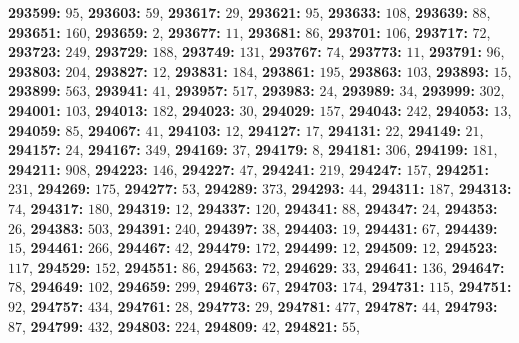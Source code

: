 \textsf{\bfseries 293599:} $95$, \textsf{\bfseries 293603:} $59$, \textsf{\bfseries 293617:} $29$, \textsf{\bfseries 293621:} $95$, \textsf{\bfseries 293633:} $108$, \textsf{\bfseries 293639:} $88$, \textsf{\bfseries 293651:} $160$, \textsf{\bfseries 293659:} $2$, \textsf{\bfseries 293677:} $11$, \textsf{\bfseries 293681:} $86$, \textsf{\bfseries 293701:} $106$, \textsf{\bfseries 293717:} $72$, \textsf{\bfseries 293723:} $249$, \textsf{\bfseries 293729:} $188$, \textsf{\bfseries 293749:} $131$, \textsf{\bfseries 293767:} $74$, \textsf{\bfseries 293773:} $11$, \textsf{\bfseries 293791:} $96$, \textsf{\bfseries 293803:} $204$, \textsf{\bfseries 293827:} $12$, \textsf{\bfseries 293831:} $184$, \textsf{\bfseries 293861:} $195$, \textsf{\bfseries 293863:} $103$, \textsf{\bfseries 293893:} $15$, \textsf{\bfseries 293899:} $563$, \textsf{\bfseries 293941:} $41$, \textsf{\bfseries 293957:} $517$, \textsf{\bfseries 293983:} $24$, \textsf{\bfseries 293989:} $34$, \textsf{\bfseries 293999:} $302$, \textsf{\bfseries 294001:} $103$, \textsf{\bfseries 294013:} $182$, \textsf{\bfseries 294023:} $30$, \textsf{\bfseries 294029:} $157$, \textsf{\bfseries 294043:} $242$, \textsf{\bfseries 294053:} $13$, \textsf{\bfseries 294059:} $85$, \textsf{\bfseries 294067:} $41$, \textsf{\bfseries 294103:} $12$, \textsf{\bfseries 294127:} $17$, \textsf{\bfseries 294131:} $22$, \textsf{\bfseries 294149:} $21$, \textsf{\bfseries 294157:} $24$, \textsf{\bfseries 294167:} $349$, \textsf{\bfseries 294169:} $37$, \textsf{\bfseries 294179:} $8$, \textsf{\bfseries 294181:} $306$, \textsf{\bfseries 294199:} $181$, \textsf{\bfseries 294211:} $908$, \textsf{\bfseries 294223:} $146$, \textsf{\bfseries 294227:} $47$, \textsf{\bfseries 294241:} $219$, \textsf{\bfseries 294247:} $157$, \textsf{\bfseries 294251:} $231$, \textsf{\bfseries 294269:} $175$, \textsf{\bfseries 294277:} $53$, \textsf{\bfseries 294289:} $373$, \textsf{\bfseries 294293:} $44$, \textsf{\bfseries 294311:} $187$, \textsf{\bfseries 294313:} $74$, \textsf{\bfseries 294317:} $180$, \textsf{\bfseries 294319:} $12$, \textsf{\bfseries 294337:} $120$, \textsf{\bfseries 294341:} $88$, \textsf{\bfseries 294347:} $24$, \textsf{\bfseries 294353:} $26$, \textsf{\bfseries 294383:} $503$, \textsf{\bfseries 294391:} $240$, \textsf{\bfseries 294397:} $38$, \textsf{\bfseries 294403:} $19$, \textsf{\bfseries 294431:} $67$, \textsf{\bfseries 294439:} $15$, \textsf{\bfseries 294461:} $266$, \textsf{\bfseries 294467:} $42$, \textsf{\bfseries 294479:} $172$, \textsf{\bfseries 294499:} $12$, \textsf{\bfseries 294509:} $12$, \textsf{\bfseries 294523:} $117$, \textsf{\bfseries 294529:} $152$, \textsf{\bfseries 294551:} $86$, \textsf{\bfseries 294563:} $72$, \textsf{\bfseries 294629:} $33$, \textsf{\bfseries 294641:} $136$, \textsf{\bfseries 294647:} $78$, \textsf{\bfseries 294649:} $102$, \textsf{\bfseries 294659:} $299$, \textsf{\bfseries 294673:} $67$, \textsf{\bfseries 294703:} $174$, \textsf{\bfseries 294731:} $115$, \textsf{\bfseries 294751:} $92$, \textsf{\bfseries 294757:} $434$, \textsf{\bfseries 294761:} $28$, \textsf{\bfseries 294773:} $29$, \textsf{\bfseries 294781:} $477$, \textsf{\bfseries 294787:} $44$, \textsf{\bfseries 294793:} $87$, \textsf{\bfseries 294799:} $432$, \textsf{\bfseries 294803:} $224$, \textsf{\bfseries 294809:} $42$, \textsf{\bfseries 294821:} $55$, 
